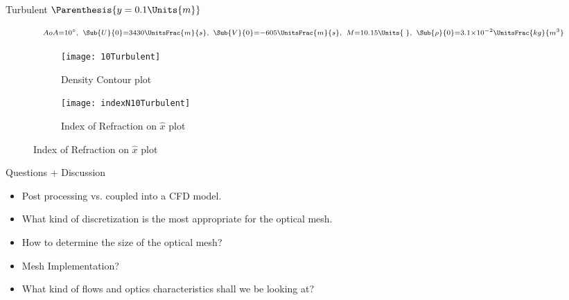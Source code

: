     \begin{frame}{Turbulent $\Parenthesis{y=0.1\Units{m}}$}
            \begin{figure}[t]
                \vspace{-1.5cm}
                \centering 
                $$\scriptstyle{ AoA = 10^{\circ},\;\; \Sub{U}{0}=3430\UnitsFrac{m}{s},\;\; \Sub{V}{0}=-605\UnitsFrac{m}{s},\;\;  M = 10.15\Units{\;},\;\; \Sub{\rho}{0} = 3.1\times 10^{-2}\UnitsFrac{kg}{m^3} }$$
            \begin{subfigure}{0.49\linewidth} \centering 
                \texttt{[image: 10Turbulent]}
                \caption{Density Contour plot}
            \end{subfigure} 
            \begin{subfigure}{0.49\linewidth} \centering 
                \texttt{[image: indexN10Turbulent]}
                \caption{Index of Refraction on $\hat{x}$ plot}
            \end{subfigure}
        \end{figure}
    \end{frame}


    \begin{frame}{Questions + Discussion}
        \begin{itemize}
            \item Post processing vs. coupled into a CFD model. \\
            \item What kind of discretization is the most appropriate for the optical mesh.\\
            \item How to determine the size of the optical mesh? \\
            \item Mesh Implementation? \\  
            \item What kind of flows and optics characteristics shall we be looking at? \\ 
        \end{itemize}
    \end{frame}
    

